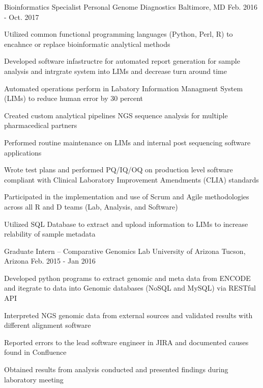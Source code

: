 \begin{cventries}
  \cventry
    {Bioinformatics Specialist} %
    {Personal Genome Diagnostics} %
    {Baltimore, MD} %
    {Feb. 2016 - Oct. 2017} %
    {
      \begin{cvitems} %
        \item{Utilized common functional programming languages (Python, Perl, R) to encahnce or replace bioinformatic analytical methods}
        \item{Developed software infastructre for automated report generation for sample analysis and intrgrate system into LIMs and decrease turn around time}
        \item{Automated operations perform in Labatory Information Managment System (LIMs) to reduce human error by 30 percent}
        \item{Created custom analytical pipelines NGS sequence analysis for multiple pharmacedical partners}
        \item{Performed routine maintenance on LIMs and internal post sequencing software applications}
        \item{Wrote test plans and performed PQ/IQ/OQ on production level software compliant with Clinical Laboratory Improvement Amendments (CLIA) standards}
        \item{Participated in the implementation and use of Scrum and Agile methodologies across all R and D teams (Lab, Analysis, and Software) }
        \item{Utilized SQL Database to extract and upload information to LIMs to increase relability of sample metadata}
      \end{cvitems}
    }

  \cventry
    {Graduate Intern – Comparative Genomics Lab} %
    {University of Arizona} %
    {Tucson, Arizona} %
    {Feb. 2015 - Jan 2016} %
    {
      \begin{cvitems} %
        \item{Developed python programs to extract genomic and meta data from ENCODE and itegrate to data into Genomic databases (NoSQL and MySQL) via RESTful API}
        \item{Interpreted NGS genomic data from external sources and validated results with different alignment software}
        \item{Reported errors to the lead software engineer in JIRA and documented causes found in Confluence}
        \item{Obtained results from analysis conducted and presented findings during laboratory meeting}
      \end{cvitems}
    }


\end{cventries}
